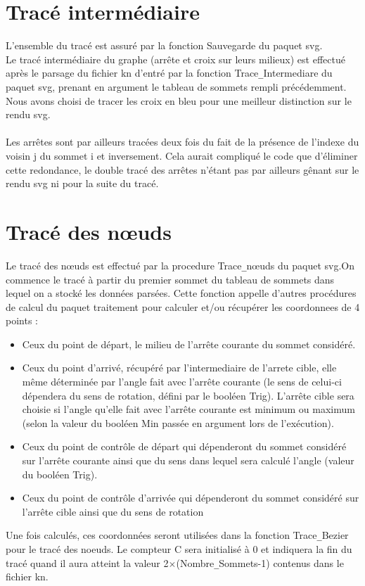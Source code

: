 \documentclass[10.9pt]{article}
\begin{document}
\section {Tracé intermédiaire}
L'ensemble du tracé est assuré par la fonction Sauvegarde du paquet svg.
\\
Le tracé intermédiaire du graphe (arrête et croix sur leurs milieux) est effectué après le parsage du fichier kn d'entré par la fonction
Trace\verb+_+Intermediare du paquet svg, prenant en argument le tableau de sommets rempli précédemment. Nous avons choisi de tracer les croix en bleu pour une meilleur distinction sur le rendu svg.\\
\\
Les arrêtes sont par ailleurs tracées deux fois du fait de la présence de l'indexe du voisin j du sommet i et inversement. Cela aurait compliqué le code que d'éliminer cette redondance, le double tracé des arrêtes n'étant pas par ailleurs gênant sur le rendu svg ni pour la suite du tracé.
\section {Tracé des nœuds}
Le tracé des nœuds est effectué par la procedure Trace\verb+_+nœuds du paquet svg.On commence le tracé à partir du premier sommet du tableau de sommets dans lequel on a stocké les données parsées. Cette fonction appelle d'autres procédures de calcul du paquet traitement pour calculer et/ou récupérer les coordonnees de 4 points :
\begin{itemize}
\item Ceux du point de départ, le milieu de l'arrête courante du sommet considéré.
\item Ceux du point d'arrivé, récupéré par l'intermediaire de l'arrete cible, elle même déterminée par l'angle fait avec l'arrête courante (le sens de celui-ci dépendera du sens de rotation, défini par le booléen Trig). L'arrête cible sera choisie si l'angle qu'elle fait avec l'arrête courante est minimum ou maximum (selon la valeur du booléen Min passée en argument lors de l'exécution).
\item Ceux du point de contrôle de départ qui dépenderont du sommet considéré sur l'arrête courante ainsi que du sens dans lequel sera calculé l'angle (valeur du booléen Trig).
\item Ceux du point de contrôle d'arrivée qui dépenderont du sommet considéré sur l'arrête cible ainsi que du sens de rotation
\end{itemize}
Une fois calculés, ces coordonnées seront utilisées dans la fonction Trace\verb+_+Bezier pour le tracé des noeuds. Le compteur C sera initialisé à 0 et indiquera la fin du tracé quand il aura atteint la valeur 2$\times$(Nombre\verb+_+Sommets-1) contenus dans le fichier kn.
\end{document}
